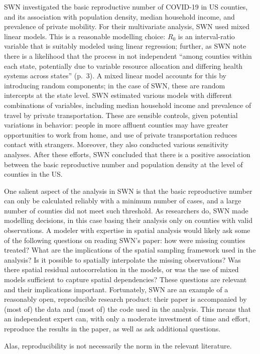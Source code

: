 \documentclass[]{elsarticle} %
\begin{document}
SWN investigated the basic reproductive number of COVID-19 in US
counties, and its association with population density, median household
income, and prevalence of private mobility. For their multivariate
analysis, SWN used mixed linear models. This is a reasonable modelling
choice: \(R_0\) is an interval-ratio variable that is suitably modeled
using linear regression; further, as SWN note there is a likelihood that
the process in not independent ``among counties within each state,
potentially due to variable resource allocation and differing health
systems across states'' (p.~3). A mixed linear model accounts for this
by introducing random components; in the case of SWN, these are random
intercepts at the state level. SWN estimated various models with
different combinations of variables, including median household income
and prevalence of travel by private transportation. These are sensible
controls, given potential variations in behavior: people in more
affluent counties may have greater opportunities to work from home, and
use of private transportation reduces contact with strangers. Moreover,
they also conducted various sensitivity analyses. After these efforts,
SWN concluded that there is a positive association between the basic
reproductive number and population density at the level of counties in
the US.

One salient aspect of the analysis in SWN is that the basic reproductive
number can only be calculated reliably with a minimum number of cases,
and a large number of counties did not meet such threshold. As
researchers do, SWN made modelling decisions, in this case basing their
analysis only on counties with valid observations. A modeler with
expertise in spatial analysis would likely ask some of the following
questions on reading SWN's paper: how were missing counties treated?
What are the implications of the spatial sampling framework used in the
analysis? Is it possible to spatially interpolate the missing
observations? Was there spatial residual autocorrelation in the models,
or was the use of mixed models sufficient to capture spatial
dependencies? These questions are relevant and their implications
important. Fortunately, SWN are an example of a reasonably open,
reproducible research product: their paper is accompanied by (most of)
the data and (most of) the code used in the analysis. This means that an
independent expert can, with only a moderate investment of time and
effort, reproduce the results in the paper, as well as ask additional
questions.

Alas, reproducibility is not necessarily the norm in the relevant
literature.
\end{document}
